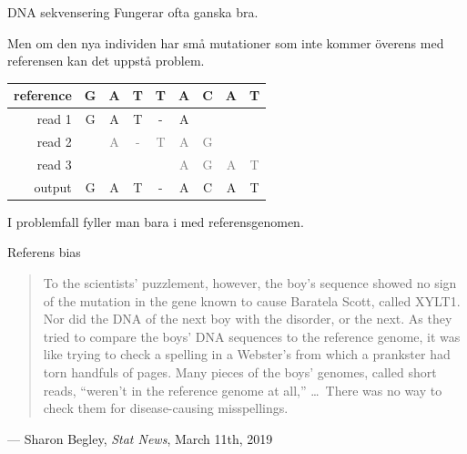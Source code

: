 \documentclass[11pt, aspectratio=169, table]{beamer}
\begin{document}
\begin{frame}{DNA sekvensering}
\setlength{\parskip}{\fill}
Fungerar ofta ganska bra.

Men om den nya individen har små mutationer som inte kommer överens med referensen kan det uppstå problem.

\begin{center}
\tt \begin{tabular}{r|cccccccc}
\sf reference & G & A & T & T & A & C & A & T\\
\hline
\sf read 1    & G & A & T & - & A\\
\sf read 2    &   & \textcolor{gray}{A} & \textcolor{gray}{-} & \textcolor{gray}{T} & \textcolor{gray}{A} & \textcolor{gray}{G}\\
\sf read 3    &   &   &   &   & \textcolor{gray}{A} & \textcolor{gray}{G} & \textcolor{gray}{A} & \textcolor{gray}{T}\\
\hline
\sf output    & G & A & T & - & A & C & A & T
\end{tabular}
\end{center}

I problemfall fyller man bara i med referensgenomen.
\end{frame}

\begin{frame}{Referens bias}
\small
\begin{quotation}
To the scientists' puzzlement, however, the boy's sequence showed no sign of the mutation in the gene known to 
cause Baratela Scott, called XYLT1. Nor did the DNA of the next boy with the disorder, or the next. As they 
tried to compare the boys' DNA sequences to the reference genome, it was like trying to check a spelling in a 
Webster's from which a prankster had torn handfuls of pages. Many pieces of the boys’ genomes, called short reads,
``weren’t in the reference genome at all,'' \dots\ There was no way to check them for disease-causing misspellings.
\end{quotation}

\hfill --- Sharon Begley, {\it Stat News}, March 11th, 2019
\end{frame}
\end{document}
